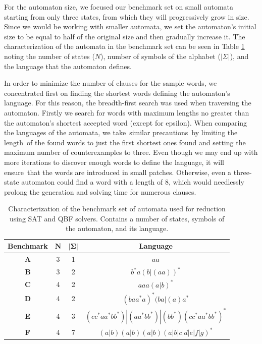 For the automaton size, we focused our benchmark set on small automata starting from only three states, from which they will progressively grow in size. Since we would be working with smaller automata, we set the automaton's initial size to be equal to half of the original size and then gradually increase it. The characterization of the automata in the benchmark set can be seen in Table \ref{tab:benchamrks} noting the number of states ($N$), number of symbols of the alphabet ($|\Sigma|$), and the language that the automaton defines.

In order to minimize the number of clauses for the sample words, we concentrated first on finding the shortest words defining the automaton's language. For this reason, the breadth-first search was used when traversing the automaton. Firstly we search for words with maximum lengths no greater than the automaton's shortest accepted word (except for epsilon). When comparing the languages of the automata, we take similar precautions by limiting the length of the found words to just the first shortest ones found and setting the maximum number of counterexamples to three. Even though we may end up with more iterations to discover enough words to define the language, it will ensure that the words are introduced in small patches. Otherwise, even a three-state automaton could find a word with a length of 8, which would needlessly prolong the generation and solving time for numerous clauses.

\begin{table}[hb]
    \centering
    \label{tab:benchamrks}
    \caption{Characterization of the benchmark set of automata used for reduction using SAT and QBF solvers. Contains a number of states, symbols of the automaton, and its language.}
    \vspace{0.3cm}
    \begin{tabular}{|c||c|c|c|} \hline
        \textbf{Benchmark} & $\boldsymbol{N}$ & $\boldsymbol{|\Sigma|}$ & \textbf{Language} \\ \hline \hline
        \textbf{A} & 3  & 1 &  $aa$ \\ \hline
        \textbf{B} & 3  & 2 &  $b^*a(b|(aa))^*$\\ \hline
        \textbf{C} & 4  & 2 &  $aaa(a|b)^*$ \\ \hline
        \textbf{D} & 4  & 2 &  $(baa^*a)^*(ba|(a)a^*$\\ \hline
        \textbf{E} & 4  & 3 &   $(cc^*aa^*bb^*)|(aa^*bb^*)|(bb^*)(cc^*aa^*bb^*)^*$\\ \hline
        \textbf{F} & 4  & 7 &  $(a|b)(a|b)(a|b)(a|b|c|d|e|f|g)^*$  \\ \hline
        
    \end{tabular}
\end{table}

